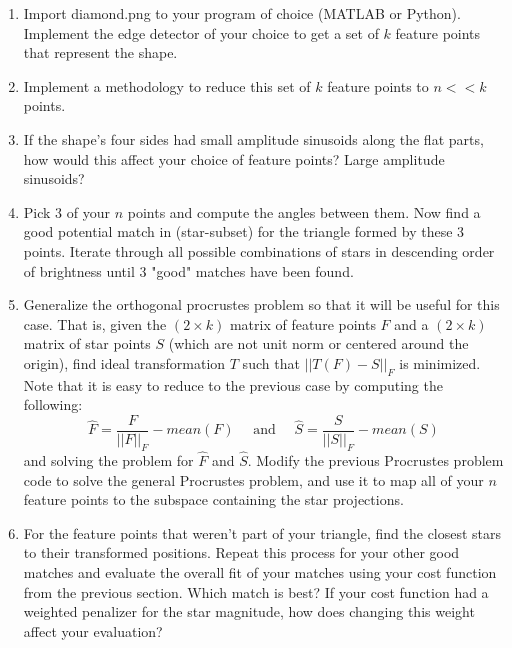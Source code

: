 \documentclass[paper=a4, fontsize=11pt]{scrartcl} %
\begin{document}
\begin{enumerate}
  \item
  Import diamond.png to your program of choice (MATLAB or Python). Implement the edge detector of your choice to get a set of $k$ feature points that represent the shape. 
  \item 
  Implement a methodology to reduce this set of $k$ feature points to $n << k$  points. 
  \item
  If the shape's four sides had small amplitude sinusoids along the flat parts, how would this affect your choice of feature points? Large amplitude sinusoids?
  \item
  Pick $3$ of your $n$ points and compute the angles between them. Now find a good potential match in (star-subset) for the triangle formed by these 3 points. Iterate through all possible combinations of stars in descending order of brightness until 3 "good" matches have been found.
  \item
  Generalize the orthogonal procrustes problem so that it will be useful for this case. That is, given the $(2\times k)$ matrix of feature points $F$ and a  $(2\times k)$ matrix of star points $S$ (which are not unit norm or centered around the origin), find ideal transformation $T$ such that $||T(F)-S||_F$ is minimized.  Note that it is easy to reduce to the previous case by computing the following:
  $$
  \hat{F} = \frac{F}{||F||_F} - mean(F)\quad\textrm{ and }\quad\hat{S} = \frac{S}{||S||_F} - mean(S)
  $$
  and solving the problem for $\hat{F}$ and $\hat{S}$. Modify the previous Procrustes problem code to solve the general Procrustes problem, and use it to map all of your $n$ feature points to the subspace containing the star projections.
  \item
  For the feature points that weren't part of your triangle, find the closest stars to their transformed positions. Repeat this process for your other good matches and evaluate the overall fit of your matches using your cost function from the previous section. Which match is best? If your cost function had a weighted penalizer for the star magnitude, how does changing this weight affect your evaluation?
\end{enumerate}



\end{document}
